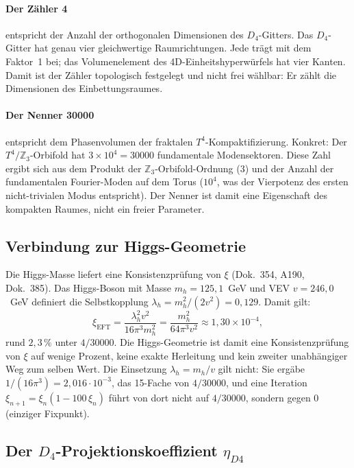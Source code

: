 \paragraph{Der Zähler 4} entspricht der Anzahl der orthogonalen
Dimensionen des $D_4$-Gitters. Das $D_4$-Gitter hat genau vier
gleichwertige Raumrichtungen. Jede trägt mit dem Faktor~1 bei; das
Volumenelement des 4D-Einheitshyperwürfels hat vier Kanten. Damit ist
der Zähler topologisch festgelegt und nicht frei wählbar: Er zählt die
Dimensionen des Einbettungsraumes.

\paragraph{Der Nenner 30000} entspricht dem Phasenvolumen der
fraktalen $T^4$-Kompaktifizierung. Konkret: Der
$T^4/\mathbb{Z}_3$-Orbifold hat $3 \times 10^4 = 30000$ fundamentale
Modensektoren. Diese Zahl ergibt sich aus dem Produkt der
$\mathbb{Z}_3$-Orbifold-Ordnung ($3$) und der Anzahl der fundamentalen
Fourier-Moden auf dem Torus ($10^4$, was der Vierpotenz des ersten
nicht-trivialen Modus entspricht). Der Nenner ist damit eine
Eigenschaft des kompakten Raumes, nicht ein freier Parameter.

\subsection{Verbindung zur Higgs-Geometrie}

Die Higgs-Masse liefert eine Konsistenzprüfung von $\xi$ (Dok.~354,
A190, Dok.~385). Das Higgs-Boson mit Masse $m_h = 125{,}1$~GeV und
VEV $v = 246{,}0$~GeV definiert die Selbstkopplung
$\lambda_h = m_h^2/(2v^2) = 0{,}129$. Damit gilt:
\begin{equation}
  \xi_{\text{EFT}} = \frac{\lambda_h^2 v^2}{16\pi^3 m_h^2}
      = \frac{m_h^2}{64\pi^3 v^2}
      \approx 1{,}30 \times 10^{-4},
\end{equation}
rund $2{,}3\,\%$ unter $4/30000$. Die Higgs-Geometrie ist damit eine
Konsistenzprüfung von $\xi$ auf wenige Prozent, keine exakte Herleitung
und kein zweiter unabhängiger Weg zum selben Wert. Die Einsetzung
$\lambda_h = m_h/v$ gilt nicht: Sie ergäbe $1/(16\pi^3) = 2{,}016\cdot10^{-3}$,
das 15-Fache von $4/30000$, und eine Iteration
$\xi_{n+1} = \xi_n(1-100\,\xi_n)$ führt von dort nicht auf $4/30000$,
sondern gegen 0 (einziger Fixpunkt).

\subsection{Der \texorpdfstring{$D_4$}{D4}-Projektionskoeffizient
  \texorpdfstring{$\eta_{D4}$}{eta\_D4}}

